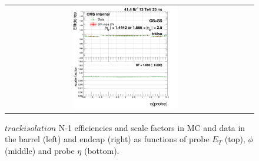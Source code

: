 \begin{figure}[bh]
\begin{center}
\begin{tabular}{cc}
      \includegraphics[width=0.45\textwidth]{figures/Zprime/2017/ScaleFactor/SameSign/N-1/g_compare_cut_eta_Barrel+Endcap_ea_ta_inc_AS_N_1_TrkIso_PUW.png}
    \end{tabular}
    \caption{$track isolation$ N-1 efficiencies and scale factors in MC and data in the barrel (left) and endcap (right) as functions of probe $E_T$ (top), $\phi$ (middle) and probe $\eta$ (bottom).}
    \label{fig:TrkIso_2017}
  \end{center}
\end{figure}

